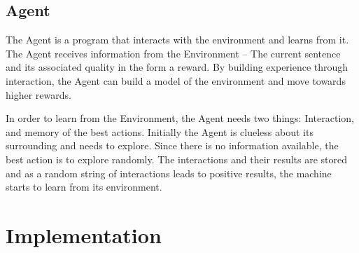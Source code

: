 \documentclass[a4paper, justified]{tufte-handout}
\begin{document}
\subsection{Agent}

The Agent is a program that interacts with the environment and learns from it. The Agent receives information from the Environment – The current sentence and its associated quality in the form a reward. By building experience through interaction, the Agent can build a model of the environment and move towards higher rewards.

In order to learn from the Environment, the Agent needs two things: Interaction, and memory of the best actions. Initially the Agent is clueless about its surrounding and needs to explore. Since there is no information available, the best action is to explore randomly. The interactions and their results are stored and as a random string of interactions leads to positive results, the machine starts to learn from its environment.\cite{thomas2018}

\section{Implementation}





\end{document}
